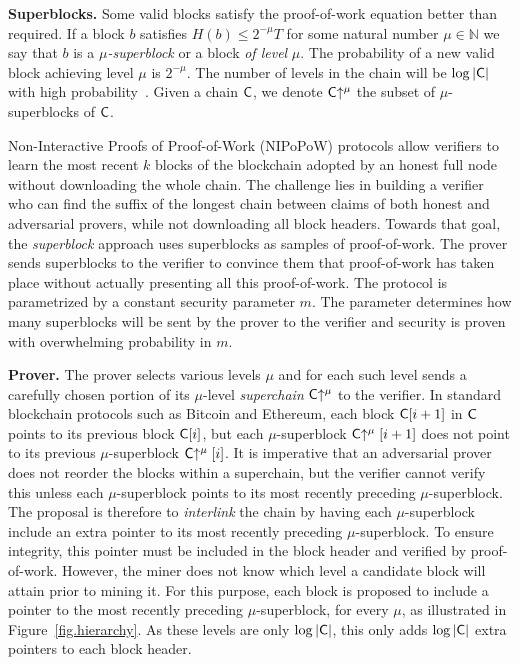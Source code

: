 \noindent
\textbf{Superblocks.}
Some valid blocks satisfy the proof-of-work equation better than required. If
a block $b$ satisfies $H(b) \leq 2^{-\mu} T$ for some natural number
$\mu \in \mathbb{N}$ we say that $b$ is a \emph{$\mu$-superblock} or a block
\emph{of level} $\mu$. The probability of a new valid block achieving level
$\mu$ is $2^{-\mu}$. The number of levels in the chain will be $\log|\mathsf{C}|$
with high probability~\cite{popow}. Given a chain $\mathsf{C}$, we denote
$\mathsf{C}\negthickspace\uparrow^\mu$ the subset of $\mu$-superblocks of $\mathsf{C}$.

Non-Interactive Proofs of Proof-of-Work (NIPoPoW) protocols allow verifiers to
learn the most recent $k$ blocks of the blockchain adopted by an honest full
node without downloading the whole chain. The challenge lies in building a
verifier who can find the suffix of the longest chain between claims of both
honest and adversarial provers, while not downloading all block headers. Towards
that goal, the \emph{superblock} approach uses superblocks as samples of
proof-of-work. The prover sends superblocks to the verifier to convince them
that proof-of-work has taken place without actually presenting all this
proof-of-work. The protocol is parametrized by a constant security parameter
$m$. The parameter determines how many superblocks will be sent by the prover to
the verifier and security is proven with overwhelming probability in $m$.

\noindent
\textbf{Prover.}
The prover selects various levels $\mu$ and for each such level sends a
carefully chosen portion of its $\mu$-level \emph{superchain}
$\mathsf{C}\negthickspace\uparrow^\mu$ to the verifier. In standard blockchain protocols such as
Bitcoin and Ethereum, each block $\mathsf{C}[i + 1]$ in $\mathsf{C}$ points to its
previous block $\mathsf{C}[i]$, but each $\mu$-superblock $\mathsf{C}\negthickspace\uparrow^\mu[i +
1]$ does not point to its previous $\mu$-superblock $\mathsf{C}\negthickspace\uparrow^\mu[i]$. It
is imperative that an adversarial prover does not reorder the blocks within a
superchain, but the verifier cannot verify this unless each $\mu$-superblock
points to its most recently preceding $\mu$-superblock. The proposal is
therefore to \emph{interlink} the chain by having each $\mu$-superblock include
an extra pointer to its most recently preceding $\mu$-superblock. To ensure
integrity, this pointer must be included in the block header and verified by
proof-of-work. However, the miner does not know which level a candidate block
will attain prior to mining it. For this purpose, each block is proposed to
include a pointer to the most recently preceding $\mu$-superblock, for every
$\mu$, as illustrated in Figure~\ref{fig.hierarchy}. As these levels are only
$\log|\mathsf{C}|$, this only adds $\log|\mathsf{C}|$ extra pointers to each block
header.

